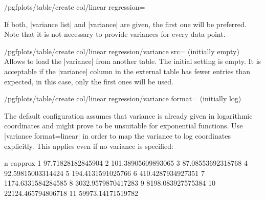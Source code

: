 {\begin{stylekey}{/pgfplots/table/create col/linear regression=}
\begin{keylist}
\begin{codeexample}[]
\end{codeexample}

        If both, |variance list| and |variance| are given, the first one will
        be preferred. Note that it is not necessary to provide variances for
        every data point.
    \end{keylist}

    \begin{key}{/pgfplots/table/create col/linear regression/variance src= (initially empty)}
        Allows to load the |variance| from another table. The initial setting
        is empty. It is acceptable if the |variance| column in the external
        table has fewer entries than expected, in this case, only the first
        ones will be used.
    \end{key}

    \begin{key}{/pgfplots/table/create col/linear regression/variance format= (initially log)}

		The default configuration assumes that variance is already given in logarithmic coordinates and might prove to be unsuitable for exponential functions. Use |variance format=linear| in order to map the variance to log coordinates explicitly. This applies even if no variance is specified:

\begin{codeexample}
n  eapprox
1  97.71828182845904
2  101.38905609893065
3  87.08553692318768
4  92.59815003314424
5  194.4131591025766
6  410.4287934927351
7  1174.6331584284585
8  3032.9579870417283
9  8198.083927575384
10 22124.465794806718
11 59973.14171519782
\end{codeexample}
        
\begin{codeexample}[]
\end{codeexample}


\end{key}
\end{stylekey}}
